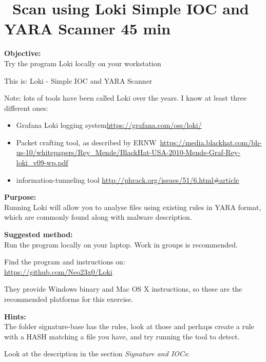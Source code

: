 \documentclass[a4paper,11pt,notitlepage]{report}
\begin{document}
\chapter{\faExclamationTriangle\ Scan using Loki Simple IOC and YARA Scanner 45 min}
\label{ex:loki-ioc-yara}

{\bf Objective:}\\
Try the program Loki locally on your workstation

This is: Loki - Simple IOC and YARA Scanner

Note: lots of tools have been called Loki over the years. I know at least three different ones:
\begin{itemize}
\item Grafana Loki logging system\url{https://grafana.com/oss/loki/}
\item Packet crafting tool, as described by ERNW\
\url{https://media.blackhat.com/bh-us-10/whitepapers/Rey_Mende/BlackHat-USA-2010-Mende-Graf-Rey-loki_v09-wp.pdf}
\item information-tunneling tool \url{http://phrack.org/issues/51/6.html#article}
\end{itemize}


{\bf Purpose:}\\
Running Loki will allow you to analyse files using existing rules in YARA format, which are commonly found along with malware description.


\begin{alltt}


\end{alltt}


{\bf Suggested method:}\\
Run the program locally on your laptop. Work in groups is recommended.

Find the program and instructions on:\\
\url{https://github.com/Neo23x0/Loki}

They provide Windows binary and Mac OS X instructions, so these are the recommended platforms for this exercise.

{\bf Hints:}\\
The folder signature-base has the rules, look at those and perhaps create a rule with a HASH matching a file you have, and try running the tool to detect.

Look at the description in the section \emph{Signature and IOCs}:
\end{document}
